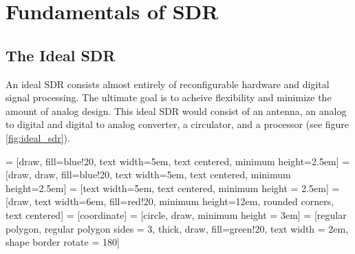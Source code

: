 \documentclass[a4paper, 12pt, notitlepage]{article}
\begin{document}
\section{Fundamentals of SDR}
\label{sec:sdr_funadamentals}
\subsection{The Ideal SDR}
\label{sec:ideal_sdr}
An ideal SDR consists almost entirely of reconfigurable hardware and digital signal processing. The ultimate goal is to acheive flexibility and minimize the amount of analog design.  This ideal SDR would consist of an antenna, an analog to digital and digital to analog converter, a circulator, and a processor (see figure \ref{fig:ideal_sdr}).


 = [draw, fill=blue!20, text width=5em, 
    text centered, minimum height=2.5em]
 = [draw, draw, fill=blue!20, text width=5em, 
    text centered, minimum height=2.5em]
 = [text width=5em, text centered, minimum height = 2.5em]
 = [draw, text width=6em, fill=red!20, 
    minimum height=12em, rounded corners, text centered]
 = [coordinate]
 = [circle, draw, minimum height = 3em]
 = [regular polygon, regular polygon sides = 3, thick, draw, fill=green!20, text width = 2em, shape border rotate = 180]


\def\blockdist{2.3}
\def\edgedist{2.5}
\end{document}
